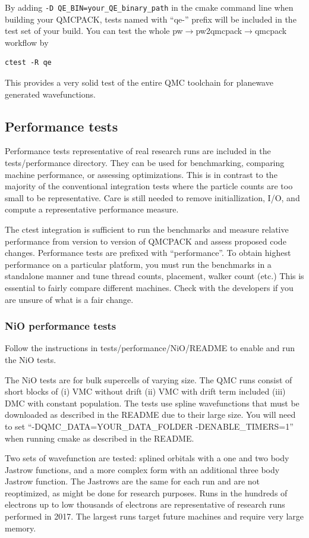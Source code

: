 By adding \texttt{-D QE\_BIN=your\_QE\_binary\_path} in the cmake command line when building your QMCPACK,
tests named with ``qe-'' prefix will be included in the test set of your build.
You can test the whole pw$\to$pw2qmcpack$\to$qmcpack workflow by
\begin{verbatim}
ctest -R qe
\end{verbatim}
This provides a very solid test of the entire QMC
toolchain for planewave generated wavefunctions.

\subsection{Performance tests}
\label{sec:perftests}
Performance tests representative of real research runs are included in the
tests/performance directory. They can be used for benchmarking, comparing machine
performance, or assessing optimizations. This is in
contrast to the majority of the conventional integration tests where the particle
counts are too small to be representative. Care is still needed to
remove initiallization, I/O, and compute a representative performance
measure.

The ctest integration is sufficient to run the benchmarks and measure
relative performance from version to version of QMCPACK and assess
proposed code changes. Performance tests are prefixed with
``performance''. To obtain highest performance on a particular
platform, you must run the benchmarks in a standalone manner and tune
thread counts, placement, walker count (etc.) This is essential to
fairly compare different machines. Check with the
developers if you are unsure of what is a fair change.

\subsubsection{NiO performance tests}

Follow the instructions in tests/performance/NiO/README to
enable and run the NiO tests.

The NiO tests are for bulk supercells of varying size. The QMC runs consist of short blocks of (i) VMC
without drift (ii) VMC with drift term included (iii) DMC with
constant population. The tests use spline wavefunctions that must be
downloaded as described in the README due to their large size. You
will need to set ``-DQMC\_DATA=YOUR\_DATA\_FOLDER -DENABLE\_TIMERS=1''
when running cmake as
described in the README.

Two sets of wavefunction are tested: splined orbitals with a one and
two body Jastrow functions, and a more complex form with an additional
three body Jastrow function. The Jastrows are the same for each run
and are not reoptimized, as might be done for research purposes.  Runs
in the hundreds of electrons up to low thousands of electrons are representative of
research runs performed in 2017. The largest runs target
future machines and require very large memory.

